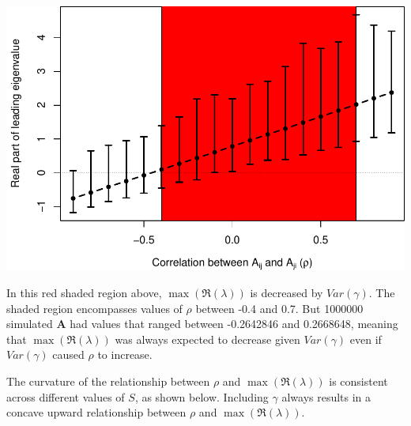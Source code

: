 \documentclass[]{article}
\begin{document}
\includegraphics{revision_notes_files/figure-latex/unnamed-chunk-12-1.pdf}

In this red shaded region above, \(\max(\Re(\lambda))\) is decreased by
\(Var(\gamma)\). The shaded region encompasses values of \(\rho\)
between -0.4 and 0.7. But 1000000 simulated \(\textbf{A}\) had values
that ranged between -0.2642846 and 0.2668648, meaning that
\(\max(\Re(\lambda))\) was always expected to decrease given
\(Var(\gamma)\) even if \(Var(\gamma)\) caused \(\rho\) to increase.

The curvature of the relationship between \(\rho\) and
\(\max(\Re(\lambda))\) is consistent across different values of \(S\),
as shown below. Including \(\gamma\) always results in a concave upward
relationship between \(\rho\) and \(\max(\Re(\lambda))\).
\end{document}
